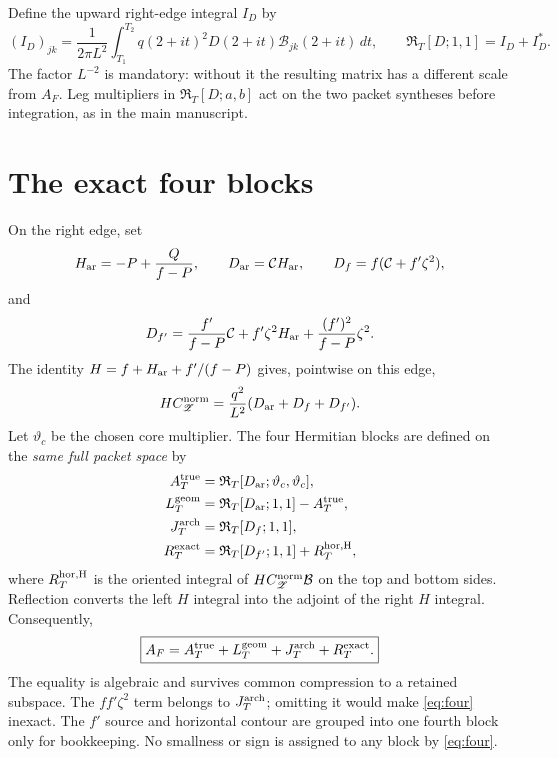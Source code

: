 \documentclass[11pt]{article}
\newcommand{\CC}{\mathcal C}
\newcommand{\RR}{\mathfrak R_T}
\newcommand{\BF}{\mathcal B}
\newcommand{\ZZ}{\mathscr Z}
\begin{document}
Define the upward right-edge integral $I_D$ by
\begin{equation}
(I_D)_{jk}=\frac{1}{2\pi L^2}\int_{T_1}^{T_2}
q(2+it)^2D(2+it)\BF_{jk}(2+it)\,dt,
\qquad \RR[D;1,1]=I_D+I_D^*.
\label{eq:right}
\end{equation}
The factor $L^{-2}$ is mandatory: without it the resulting matrix has a
different scale from $A_F$. Leg multipliers in $\RR[D;a,b]$ act on the two
packet syntheses before integration, as in the main manuscript.

\section{The exact four blocks}

On the right edge, set
\begin{equation}
H_{\rm ar}=-P+\frac{Q}{f-P},\qquad
D_{\rm ar}=\CC H_{\rm ar},\qquad
D_f=f(\CC+f'\zeta^2),
\label{eq:ar}
\end{equation}
and
\begin{equation}
D_{f'}=\frac{f'}{f-P}\CC+f'\zeta^2H_{\rm ar}
          +\frac{(f')^2}{f-P}\zeta^2.
\label{eq:fp}
\end{equation}
The identity $H=f+H_{\rm ar}+f'/(f-P)$ gives, pointwise on this edge,
\begin{equation}
HC_{\ZZ}^{\rm norm}
=\frac{q^2}{L^2}(D_{\rm ar}+D_f+D_{f'}).
\label{eq:pointwise}
\end{equation}
Let $\vartheta_c$ be the chosen core multiplier. The four Hermitian blocks
are defined on the \emph{same full packet space} by
\begin{align}
A_T^{\rm true}&=\RR[D_{\rm ar};\vartheta_c,\vartheta_c],
\label{eq:true}\\
L_T^{\rm geom}&=\RR[D_{\rm ar};1,1]-A_T^{\rm true},
\label{eq:geom}\\
J_T^{\rm arch}&=\RR[D_f;1,1],
\label{eq:arch}\\
R_T^{\rm exact}&=\RR[D_{f'};1,1]+R_T^{\rm hor,H},
\label{eq:remainder}
\end{align}
where $R_T^{\rm hor,H}$ is the oriented integral of
$HC_{\ZZ}^{\rm norm}\BF$ on the top and bottom sides. Reflection converts the
left $H$ integral into the adjoint of the right $H$ integral. Consequently,
\begin{equation}
\boxed{A_F=A_T^{\rm true}+L_T^{\rm geom}
                +J_T^{\rm arch}+R_T^{\rm exact}.}
\label{eq:four}
\end{equation}
The equality is algebraic and survives common compression to a retained
subspace. The $ff'\zeta^2$ term belongs to $J_T^{\rm arch}$; omitting it would
make \eqref{eq:four} inexact. The $f'$ source and horizontal contour are grouped
into one fourth block only for bookkeeping. No smallness or sign is assigned to
any block by \eqref{eq:four}.
\end{document}
